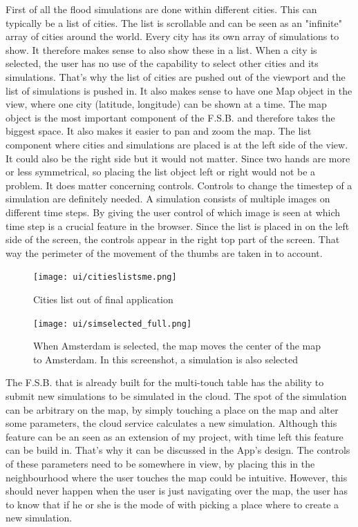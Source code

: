 First of all the flood simulations are done within different cities. This can typically be a list of cities. The list is scrollable and can be seen as an "infinite" array of cities around the world. Every city has its own array of simulations to show. It therefore makes sense to also show these in a list. When a city is selected, the user has no use of the capability to select other cities and its simulations. That's why the list of cities are pushed out of the viewport and the list of simulations is pushed in. 
It also makes sense to have one Map object in the view, where one city (latitude, longitude) can be shown at a time. The map object is the most important component of the F.S.B. and therefore takes the biggest space. It also makes it easier to pan and zoom the map.
The list component where cities and simulations are placed is at the left side of the view. It could also be the right side but it would not matter. Since two hands are more or less symmetrical, so placing the list object left or right would not be a problem. It does matter concerning controls. Controls to change the timestep of a simulation are definitely needed. A simulation consists of multiple images on different time steps. By giving the user control of which image is seen at which time step is a crucial feature in the browser. Since the list is placed in on the left side of the screen, the controls appear in the right top part of the screen. That way the perimeter of the movement of the thumbs are taken in to account.
\begin{figure}[H]
\center
\texttt{[image: ui/citieslistsme.png]}
\caption{Cities list out of final application}
\label{citieslist}
\end{figure}

\begin{figure}
\center
\texttt{[image: ui/simselected\_full.png]}
\caption{When Amsterdam is selected, the map moves the center of the map to Amsterdam. In this screenshot, a simulation is also selected}
\label{simullist}
\end{figure}

The F.S.B. that is already built for the multi-touch table has the ability to submit new simulations to be simulated in the cloud. The spot of the simulation can be arbitrary on the map, by simply touching a place on the map and alter some parameters, the cloud service calculates a new simulation. Although this feature can be an seen as an extension of my project, with time left this feature can be build in. That's why it can be discussed in the App's design. The controls of these parameters need to be somewhere in view, by placing this in the neighbourhood where the user touches the map could be intuitive. However, this should never happen when the user is just navigating over the map, the user has to know that if he or she is the mode of with picking a place where to create a new simulation. 

